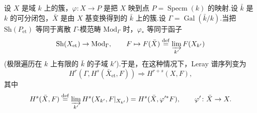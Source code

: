 \begin{example}\label{ex:12.8}
设 $X$ 是域 $k$ 上的簇，$\varphi \colon X \to P$ 是把 $X$ 映到点 $P = \operatorname{Specm}(k)$ 的映射.设 $\bar{k}$ 是 $k$ 的可分闭包，$\bar{X}$ 是由 $X$ 基变换得到的 $\bar{k}$ 上的簇.设 $\Gamma = \operatorname{Gal}(\bar{k}/k)$.当把 $\mathrm{Sh}(P_{\mathrm{et}})$ 等同于离散 $\Gamma$-模范畴 $\mathrm{Mod}_{\Gamma}$ 时，$\varphi_{*}$ 等同于函子
\[
\mathrm{Sh}(X_{\mathrm{et}}) \to \mathrm{Mod}_{\Gamma}, \qquad F \mapsto F(\bar{X}) \overset{\mathrm{def}}{=} \varinjlim_{k'} F(X_{k'})
\]
(极限遍历在 $k$ 上有限的 $\bar{k}$ 的子域 $k'$).于是，在这种情况下，Leray 谱序列变为
\[
H^{r}(\Gamma, H^{s}(\bar{X}_{\mathrm{et}}, F)) \Rightarrow H^{r+s}(X, F),
\]
其中
\[
H^{s}(\bar{X}, F) \overset{\mathrm{def}}{=} \varinjlim_{k'} H^{s}(X_{k'}, F|_{X_{k'}}) = H^{s}(\bar{X}, \varphi'^{*}F), \qquad \varphi' \colon \bar{X} \to X.
\]
\end{example}
